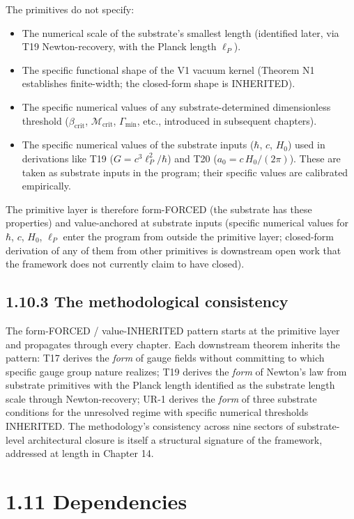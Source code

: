 \documentclass[11pt]{book}
\begin{document}
The primitives do not specify:
\begin{itemize}
\item The numerical scale of the substrate's smallest length (identified later, via T19 Newton-recovery, with the Planck length $\ell_P$).
\item The specific functional shape of the V1 vacuum kernel (Theorem N1 establishes finite-width; the closed-form shape is INHERITED).
\item The specific numerical values of any substrate-determined dimensionless threshold ($\beta_\mathrm{crit}$, $\mathcal{M}_\mathrm{crit}$, $\Gamma_\mathrm{min}$, etc., introduced in subsequent chapters).
\item The specific numerical values of the substrate inputs ($\hbar$, $c$, $H_0$) used in derivations like T19 ($G = c^3\ell_P^2/\hbar$) and T20 ($a_0 = c\,H_0/(2\pi)$). These are taken as substrate inputs in the program; their specific values are calibrated empirically.
\end{itemize}

The primitive layer is therefore form-FORCED (the substrate has these properties) and value-anchored at substrate inputs (specific numerical values for $\hbar$, $c$, $H_0$, $\ell_P$ enter the program from outside the primitive layer; closed-form derivation of any of them from other primitives is downstream open work that the framework does not currently claim to have closed).

\subsection{1.10.3 The methodological consistency}

The form-FORCED / value-INHERITED pattern starts at the primitive layer and propagates through every chapter. Each downstream theorem inherits the pattern: T17 derives the \textit{form} of gauge fields without committing to which specific gauge group nature realizes; T19 derives the \textit{form} of Newton's law from substrate primitives with the Planck length identified as the substrate length scale through Newton-recovery; UR-1 derives the \textit{form} of three substrate conditions for the unresolved regime with specific numerical thresholds INHERITED. The methodology's consistency across nine sectors of substrate-level architectural closure is itself a structural signature of the framework, addressed at length in Chapter 14.

\section{1.11 Dependencies}
\end{document}
